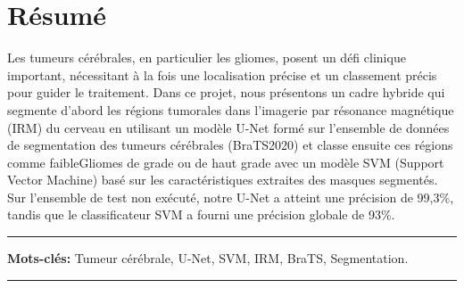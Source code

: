\chapter*{\hfill Résumé \hfill}

Les tumeurs cérébrales, en particulier les gliomes, posent un défi clinique important, nécessitant à la fois une localisation précise et un classement précis pour guider le traitement. Dans ce projet, nous présentons un cadre hybride qui segmente d’abord les régions tumorales dans l’imagerie par résonance magnétique (IRM) du cerveau en utilisant un modèle U-Net formé sur l’ensemble de données de segmentation des tumeurs cérébrales (BraTS2020)  et classe ensuite ces régions comme faibleGliomes de grade ou de haut grade avec un modèle SVM (Support Vector Machine) basé sur les caractéristiques extraites des masques segmentés. Sur l’ensemble de test non exécuté, notre U-Net a atteint une précision de 99,3\%, tandis que le classificateur SVM a fourni une précision globale de 93\%.

\noindent\rule{\textwidth}{0.2pt}
\textbf{Mots-clés:} Tumeur cérébrale, U-Net, SVM, IRM, BraTS, Segmentation.\\
\noindent\rule{\textwidth}{0.2pt}
